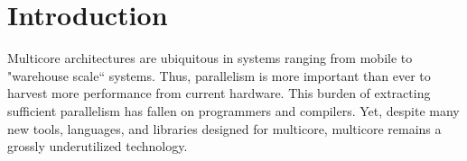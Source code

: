\section{Introduction}




Multicore architectures are ubiquitous in systems ranging from mobile to
"warehouse scale`` systems. Thus, parallelism is more important than ever to
harvest more performance from current hardware.  This burden of extracting
sufficient parallelism has fallen on programmers and compilers. Yet, despite
many new tools, languages, and libraries designed for multicore, multicore
remains a grossly underutilized technology.



